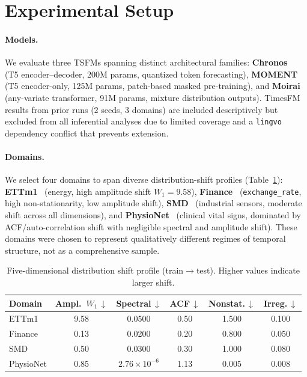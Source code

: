 \documentclass{article}
\begin{document}
\section{Experimental Setup}
\label{sec:setup}

\paragraph{Models.}
We evaluate three TSFMs spanning distinct architectural families: \textbf{Chronos}~\citep{ansari2024chronos} (T5 encoder--decoder, 200M params, quantized token forecasting), \textbf{MOMENT}~\citep{goswami2024moment} (T5 encoder-only, 125M params, patch-based masked pre-training), and \textbf{Moirai}~\citep{woo2024moirai} (any-variate transformer, 91M params, mixture distribution outputs). TimesFM~\citep{das2024timesfm} results from prior runs (2 seeds, 3 domains) are included descriptively but excluded from all inferential analyses due to limited coverage and a \texttt{lingvo} dependency conflict that prevents extension.

\paragraph{Domains.}
We select four domains to span diverse distribution-shift profiles (Table~\ref{tab:shift-profile}): \textbf{ETTm1}~\citep{zhou2021ett} (energy, high amplitude shift $W_1{=}9.58$), \textbf{Finance}~\citep{li2019logsparse} (\texttt{exchange\_rate}, high non-stationarity, low amplitude shift), \textbf{SMD}~\citep{su2019robust} (industrial sensors, moderate shift across all dimensions), and \textbf{PhysioNet}~\citep{silva2012physionet} (clinical vital signs, dominated by ACF/auto-correlation shift with negligible spectral and amplitude shift). These domains were chosen to represent qualitatively different regimes of temporal structure, not as a comprehensive sample.

\begin{table}[t]
\centering
\caption{Five-dimensional distribution shift profile (train$\to$test). Higher values indicate larger shift.}
\label{tab:shift-profile}
\small
\begin{tabular}{l ccccc}
\toprule
Domain & Ampl.\ $W_1$\,$\downarrow$ & Spectral\,$\downarrow$ & ACF\,$\downarrow$ & Nonstat.\,$\downarrow$ & Irreg.\,$\downarrow$ \\
\midrule
ETTm1     & 9.58  & 0.0500     & 0.50  & 1.500 & 0.100 \\
Finance   & 0.13  & 0.0200     & 0.20  & 0.800 & 0.050 \\
SMD       & 0.50  & 0.0300     & 0.30  & 1.000 & 0.080 \\
PhysioNet & 0.85  & $2.76\times10^{-6}$ & 1.13 & 0.005 & 0.008 \\
\bottomrule
\end{tabular}
\end{table}
\end{document}
